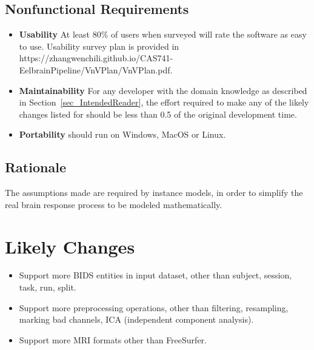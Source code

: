 \documentclass[12pt]{article}
\newcounter{nfrnum} %
\newcounter{lcnum} %
\begin{document}
\subsection{Nonfunctional Requirements}


\noindent
\begin{itemize}

    \item[NFR\refstepcounter{nfrnum}\thenfrnum \label{NFR_Usability}:] \textbf{Usability}
    At least 80\% of users when surveyed will rate the software as easy to use. Usability survey plan is provided in https://zhangwenchili.github.io/CAS741-EelbrainPipeline/VnVPlan/VnVPlan.pdf.

    \item[NFR\refstepcounter{nfrnum}\thenfrnum \label{NFR_Maintainability}:]
    \textbf{Maintainability} For any developer with the domain knowledge as described in Section~\ref{sec_IntendedReader}, the effort required to make any of the likely changes listed for \progname{} should be less than 0.5 of the original development time.

    \item[NFR\refstepcounter{nfrnum}\thenfrnum \label{NFR_Portability}:]
    \textbf{Portability} \progname{} should run on Windows, MacOS or Linux.


\end{itemize}




\subsection{Rationale}



The assumptions made are required by instance models, in order to simplify the real brain response process to be modeled mathematically.








\section{Likely Changes}    

\noindent \begin{itemize}

    \item[LC\refstepcounter{lcnum}\thelcnum\label{LC_bids}:] Support more BIDS entities in input dataset, other than subject, session, task, run, split.

    \item[LC\refstepcounter{lcnum}\thelcnum\label{LC_preprocessing}:] Support more preprocessing operations, other than filtering, resampling, marking bad channels, ICA (independent component analysis).

    \item[LC\refstepcounter{lcnum}\thelcnum\label{LC_mri}:] Support more MRI formats other than FreeSurfer.

\end{itemize}
\end{document}
